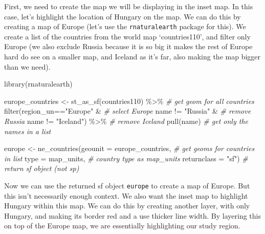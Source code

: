 \documentclass[
  krantz2]{krantz}
\makeatletter
\newenvironment{Shaded}{\begin{snugshade}}{\end{snugshade}}
\newcommand{\AttributeTok}[1]{\textcolor[rgb]{0.61,0.61,0.61}{#1}}
\newcommand{\CommentTok}[1]{\textcolor[rgb]{0.37,0.37,0.37}{\textit{#1}}}
\newcommand{\FunctionTok}[1]{\textcolor[rgb]{0,0,0}{#1}}
\newcommand{\NormalTok}[1]{#1}
\newcommand{\OtherTok}[1]{\textcolor[rgb]{0.37,0.37,0.37}{#1}}
\newcommand{\SpecialCharTok}[1]{\textcolor[rgb]{0,0,0}{#1}}
\newcommand{\StringTok}[1]{\textcolor[rgb]{0.5,0.5,0.5}{#1}}
\newenvironment{kframe}{%
\medskip{}
\setlength{\fboxsep}{.8em}
 \def\at@end@of@kframe{}%
 \ifinner\ifhmode%
  \def\at@end@of@kframe{\end{minipage}}%
  \begin{minipage}{\columnwidth}%
 \fi\fi%
 \def\FrameCommand##1{\hskip\@totalleftmargin \hskip-\fboxsep
 \colorbox{shadecolor}{##1}\hskip-\fboxsep
     \hskip-\linewidth \hskip-\@totalleftmargin \hskip\columnwidth}%
 \MakeFramed {\advance\hsize-\width
   \@totalleftmargin\z@ \linewidth\hsize
   \@setminipage}}%
 {\par\unskip\endMakeFramed%
 \at@end@of@kframe}
\renewenvironment{Shaded}{\begin{kframe}}{\end{kframe}}
\makeatother
\begin{document}
First, we need to create the map we will be displaying in the inset map. In this case, let's highlight the location of Hungary on the map. We can do this by creating a map of Europe (let's use the \texttt{rnaturalearth} package for this). We create a list of the countries from the world map `countries110', and filter only Europe (we also exclude Russia because it is so big it makes the rest of Europe hard do see on a smaller map, and Iceland as it's far, also making the map bigger than we need).

\begin{Shaded}
\begin{Highlighting}[]
\FunctionTok{library}\NormalTok{(rnaturalearth)}

\NormalTok{europe\_countries }\OtherTok{\textless{}{-}} \FunctionTok{st\_as\_sf}\NormalTok{(countries110) }\SpecialCharTok{\%\textgreater{}\%}  \CommentTok{\# get geom for all countries}
  \FunctionTok{filter}\NormalTok{(region\_un}\SpecialCharTok{==}\StringTok{"Europe"} \SpecialCharTok{\&} \CommentTok{\# select Europe}
\NormalTok{           name }\SpecialCharTok{!=} \StringTok{"Russia"} \SpecialCharTok{\&}   \CommentTok{\# remove Russia}
\NormalTok{           name }\SpecialCharTok{!=} \StringTok{"Iceland"}\NormalTok{) }\SpecialCharTok{\%\textgreater{}\%} \CommentTok{\# remove Iceland}
  \FunctionTok{pull}\NormalTok{(name) }\CommentTok{\# get only the names in a list}

\NormalTok{europe }\OtherTok{\textless{}{-}} \FunctionTok{ne\_countries}\NormalTok{(}\AttributeTok{geounit =}\NormalTok{ europe\_countries, }\CommentTok{\# get geoms for countries in list}
                       \AttributeTok{type =} \StringTok{\textquotesingle{}map\_units\textquotesingle{}}\NormalTok{,  }\CommentTok{\# country type as map\_units}
                       \AttributeTok{returnclass =} \StringTok{"sf"}\NormalTok{) }\CommentTok{\# return sf object (not sp)}
\end{Highlighting}
\end{Shaded}

Now we can use the returned sf object \texttt{europe} to create a map of Europe. But this isn't necessarily enough context. We also want the inset map to highlight Hungary within this map. We can do this by creating another layer, with only Hungary, and making its border red and a use thicker line width. By layering this on top of the Europe map, we are essentially highlighting our study region.
\end{document}
